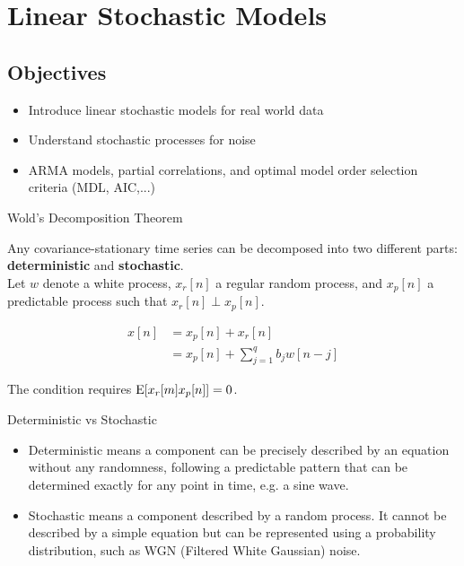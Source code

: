 \chapter{Linear Stochastic Models}

\section{Objectives}
\begin{itemize}
    \item Introduce linear stochastic models for real world data
    \item Understand stochastic processes for noise
    \item ARMA models, partial correlations, and optimal model order selection criteria (MDL, AIC,...)
\end{itemize}
\begin{theorembox}{Wold's Decomposition Theorem}

Any covariance-stationary time series can be decomposed into two different parts: \textbf{deterministic} and \textbf{stochastic}.\\

Let $w$ denote a white process, $x_r[n]$ a regular random process, and $x_p[n]$ a predictable process such that $x_r[n]\perp x_p[n]$.

\begin{align}
x[n]&=x_p[n]+x_r[n]\\
&=x_p[n]+\sum_{j=1}^qb_jw[n-j]
\end{align}

The condition requires $\text{E}[x_r[m]x_p[n]]=0$.

\end{theorembox}

\begin{definitionbox}{Deterministic vs Stochastic}
    \begin{itemize}
        \item Deterministic means a component can be precisely described by an equation without any randomness, following a predictable pattern that can be determined exactly for any point in time, e.g. a sine wave.
        \item Stochastic means a component described by a random process. It cannot be described by a simple equation but can be represented using a probability distribution, such as WGN (Filtered White Gaussian) noise.
    \end{itemize}
\end{definitionbox}

